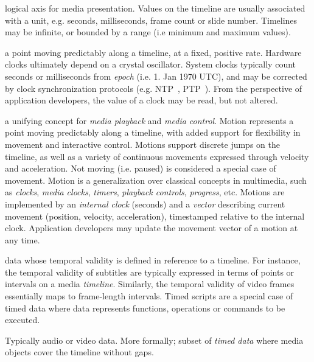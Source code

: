 

logical axis for media presentation. Values on the timeline are usually
associated with a unit, e.g. seconds, milliseconds, frame count or slide
number. Timelines may be infinite, or bounded by a range (i.e minimum and
maximum values).


a point moving predictably along a timeline, at a fixed, positive rate.
Hardware clocks ultimately depend on a crystal oscillator. System clocks
typically count seconds or milliseconds from \emph{epoch} (i.e. 1. Jan 1970
UTC), and may be corrected by clock synchronization protocols (e.g.
NTP~\cite{ntp}, PTP~\cite{ptp}). From the perspective of application
developers, the value of a clock may be read, but not altered.


a unifying concept for \emph{media playback} and \emph{media control}. Motion
represents a point moving predictably along a timeline, with added support for
flexibility in movement and interactive control. Motions support discrete
jumps on the timeline, as well as a variety of continuous movements expressed
through velocity and acceleration. Not moving (i.e. paused) is considered a
special case of movement. Motion is a generalization over classical concepts
in multimedia, such as \emph{clocks}, \emph{media clocks}, \emph{timers},
\emph{playback controls}, \emph{progress}, etc. Motions are implemented by an
\emph{internal clock} (seconds) and a \emph{vector} describing current movement (position,
velocity, acceleration), timestamped relative to the internal clock.
Application developers may update the movement vector of a motion at any time.


data whose temporal validity is defined in reference to a timeline. For
instance, the temporal validity of subtitles are typically expressed in terms
of points or intervals on a media \emph{timeline}. Similarly, the temporal validity
of video frames essentially maps to frame-length intervals. Timed scripts are
a special case of timed data where data represents functions, operations or
commands to be executed.



Typically audio or video data. More formally; subset of \emph{timed data}
where media objects cover the timeline without gaps.


